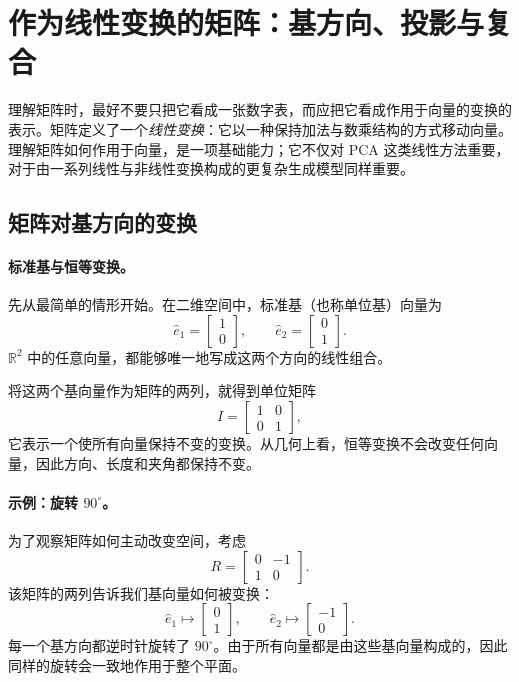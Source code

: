 

\medskip
\noindent
\section{作为线性变换的矩阵：基方向、投影与复合}

理解矩阵时，最好不要只把它看成一张数字表，而应把它看成作用于向量的变换的表示。矩阵定义了一个\emph{线性变换}：它以一种保持加法与数乘结构的方式移动向量。理解矩阵如何作用于向量，是一项基础能力；它不仅对 PCA 这类线性方法重要，对于由一系列线性与非线性变换构成的更复杂生成模型同样重要。

\subsection{矩阵对基方向的变换}

\paragraph{标准基与恒等变换。}

先从最简单的情形开始。在二维空间中，标准基（也称单位基）向量为
\[
\hat{e}_1 =
\begin{bmatrix}1 \\ 0\end{bmatrix},
\qquad
\hat{e}_2 =
\begin{bmatrix}0 \\ 1\end{bmatrix}.
\]
\(\mathbb{R}^2\) 中的任意向量，都能够唯一地写成这两个方向的线性组合。

将这两个基向量作为矩阵的两列，就得到单位矩阵
\[
I =
\begin{bmatrix}
1 & 0 \\
0 & 1
\end{bmatrix},
\]
它表示一个使所有向量保持不变的变换。从几何上看，恒等变换不会改变任何向量，因此方向、长度和夹角都保持不变。

\paragraph{示例：旋转 \(90^\circ\)。}

为了观察矩阵如何主动改变空间，考虑
\[
R =
\begin{bmatrix}
0 & -1 \\
1 & 0
\end{bmatrix}.
\]
该矩阵的两列告诉我们基向量如何被变换：
\[
\hat{e}_1 \mapsto
\begin{bmatrix}0 \\ 1\end{bmatrix},
\qquad
\hat{e}_2 \mapsto
\begin{bmatrix}-1 \\ 0\end{bmatrix}.
\]
每一个基方向都逆时针旋转了 \(90^\circ\)。由于所有向量都是由这些基向量构成的，因此同样的旋转会一致地作用于整个平面。

